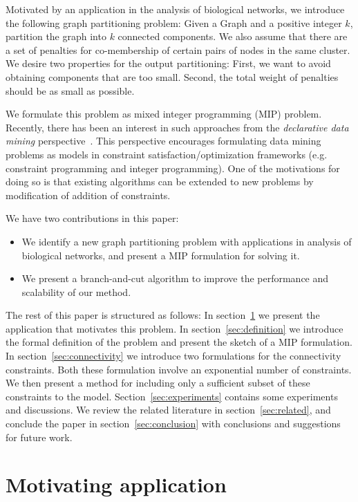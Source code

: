 \documentclass[conference,compsoc]{IEEEtran}
\begin{document}
Motivated by an application in the analysis of biological networks, we
introduce the following graph partitioning problem: Given a Graph
and a positive integer $k$, partition the graph into $k$
connected components. We also assume that there are a set of penalties
for co-membership of certain pairs of nodes in the same cluster. We
desire two properties for the output partitioning: First, we want to
avoid obtaining components that are too small. Second, the total
weight of penalties should be as small as possible.

We formulate this problem as mixed integer programming (MIP)
problem. Recently, there has been an interest in such
approaches from the \emph{declarative data mining}
perspective~\cite{DaoDV13}. This perspective encourages formulating
data mining problems as models in constraint satisfaction/optimization
frameworks (e.g. constraint programming and integer programming). One
of the motivations for doing so is that existing algorithms can be
extended to new problems by modification of addition of constraints.

We have two contributions in this paper:
\begin{itemize}
\item We identify a new graph partitioning problem with applications in analysis of biological networks, and present a MIP formulation for solving it. 
\item We present a branch-and-cut algorithm to improve the performance and scalability of our method. 
\end{itemize}

The rest of this paper is structured as follows:  In
section~\ref{sec:motivation} we present the application that motivates
this problem.  In section~\ref{sec:definition} we introduce the formal
definition of the problem and present the sketch of a MIP formulation.
In section~\ref{sec:connectivity} we introduce two formulations for
the connectivity constraints. Both these formulation involve an
exponential number of constraints. We then present a method for
including only a sufficient subset of these constraints to the
model. Section~\ref{sec:experiments} contains some experiments and
discussions. We review the related literature in section~\ref{sec:related}, and conclude the paper in section~\ref{sec:conclusion} with conclusions and suggestions for future work.


\section{Motivating application}
\label{sec:motivation}
\end{document}
